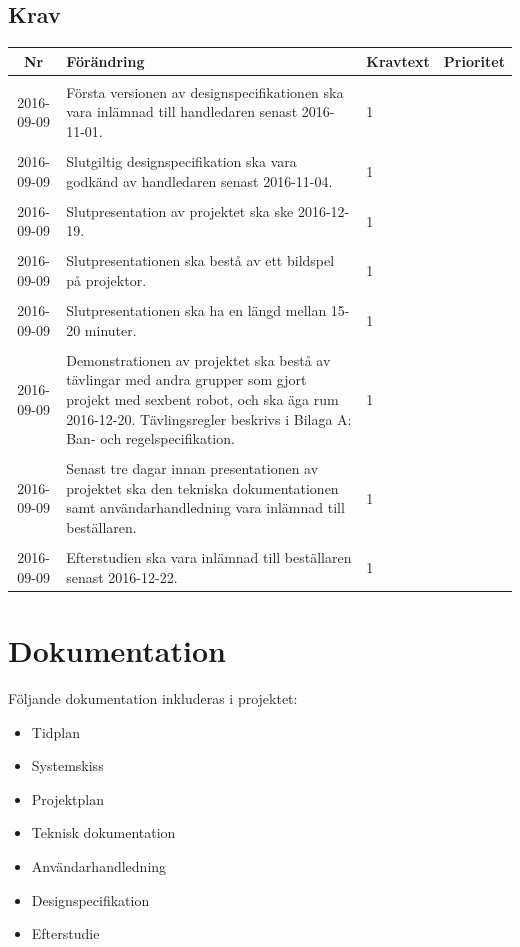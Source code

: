 \documentclass[a4paper,titlepage,12pt]{article}
\newcounter{reqNr}
\newcounter{reqNrII}
\newcommand{\nextReqNrII}{\stepcounter{reqNrII}\arabic{reqNrII}}
\newcommand{\newRequirement}[1] {\pbox{5cm}{Tillagt \\#1}}
\begin{document}
	\subsection{Krav}
	\begin{longtable}[c]{ c l>{\raggedright}p{} l }
		\hline
		\textbf{Nr} & \textbf{Förändring} & \textbf{Kravtext} & \textbf{Prioritet} 
			\\ \hline

		\nextReqNrII & \newRequirement{2016-09-09} & Första versionen av
			designspecifikationen ska vara inlämnad till handledaren senast
			2016-11-01. & 1
			\\ \hline

		\nextReqNrII & \newRequirement{2016-09-09} & Slutgiltig designspecifikation
			ska vara godkänd av handledaren senast 2016-11-04. & 1
			\\ \hline
			
		\nextReqNrII & \newRequirement{2016-09-09} & Slutpresentation av projektet ska
		ske 2016-12-19. & 1
			\\ \hline

		\nextReqNrII & \newRequirement{2016-09-09} & Slutpresentationen ska bestå av
		ett bildspel på projektor. & 1
			\\ \hline

		\nextReqNrII & \newRequirement{2016-09-09} & Slutpresentationen ska ha en
		längd mellan 15-20 minuter. & 1
			\\ \hline

		\nextReqNrII & \newRequirement{2016-09-09} & Demonstrationen av projektet ska
		bestå av tävlingar med andra grupper som gjort projekt med sexbent
		robot, och ska äga rum 2016-12-20. Tävlingsregler beskrivs i Bilaga
		A: Ban- och regelspecifikation. & 1
			\\ \hline

		\nextReqNrII & \newRequirement{2016-09-09} & Senast tre dagar innan
			presentationen av projektet ska den tekniska dokumentationen
			samt användarhandledning vara inlämnad till beställaren. & 1
			\\ \hline

		\nextReqNrII & \newRequirement{2016-09-09} & Efterstudien ska vara inlämnad
		till beställaren senast 2016-12-22. & 1
			\\ 

	\end{longtable}
	
	\section{Dokumentation}
    Följande dokumentation inkluderas i projektet:
    \begin{itemize}
		\item Tidplan 
		\item Systemskiss 
		\item Projektplan
		\item Teknisk dokumentation 
		\item Användarhandledning 
        \item Designspecifikation
        \item Efterstudie
    \end{itemize}
\end{document}
